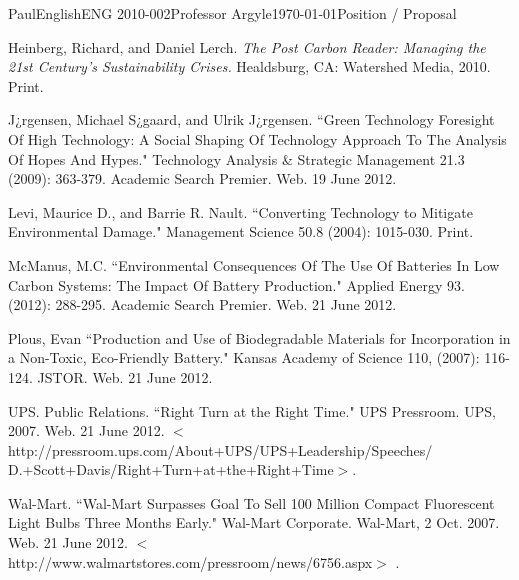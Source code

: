 \documentclass[12pt,letterpaper]{article}
\begin{document}
\begin{mla}{Paul}{English}{ENG 2010-002}{Professor Argyle}{\today}{Position / Proposal}
\begin{workscited}
\bibent
Heinberg, Richard, and Daniel Lerch. \textit{The Post Carbon Reader: Managing the 21st Century's Sustainability Crises.} Healdsburg, CA: Watershed Media, 2010. Print.

\bibent
J¿rgensen, Michael S¿gaard, and Ulrik J¿rgensen. ``Green Technology Foresight Of High Technology: A Social Shaping Of Technology Approach To The Analysis Of Hopes And Hypes." Technology Analysis \& Strategic Management 21.3 (2009): 363-379. Academic Search Premier. Web. 19 June 2012.

\bibent
Levi, Maurice D., and Barrie R. Nault. ``Converting Technology to Mitigate Environmental Damage." Management Science 50.8 (2004): 1015-030. Print.

\bibent
McManus, M.C. ``Environmental Consequences Of The Use Of Batteries In Low Carbon Systems: The Impact Of Battery Production." Applied Energy 93. (2012): 288-295. Academic Search Premier. Web. 21 June 2012.

\bibent
Plous, Evan ``Production and Use of Biodegradable Materials for Incorporation in a Non-Toxic, Eco-Friendly Battery." Kansas Academy of Science 110, (2007): 116-124. JSTOR. Web. 21 June 2012.

\bibent
UPS. Public Relations. ``Right Turn at the Right Time." UPS Pressroom. UPS, 2007. Web. 21 June 2012. $<$http://pressroom.ups.com/About+UPS/UPS+Leadership/Speeches/\\D.+Scott+Davis/Right+Turn+at+the+Right+Time$>$.

\pagebreak
\bibent
Wal-Mart. ``Wal-Mart Surpasses Goal To Sell 100 Million Compact Fluorescent Light Bulbs Three Months Early." Wal-Mart Corporate. Wal-Mart, 2 Oct. 2007. Web. 21 June 2012. $<$http://www.walmartstores.com/pressroom/news/6756.aspx$>$ .


\end{workscited}
\end{mla}
\end{document}
